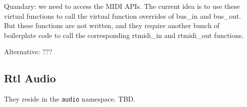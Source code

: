    Quandary: we need to access the MIDI APIs. The current idea is to use
   these virtual functions to call the virtual function overrides of bus\_in
   and bus\_out. But these functions are not written, and they require
   another bunch of boilerplate code to call the corresponding rtmidi\_in
   and rtmidi\_out functions.

   Alternative: ???



\subsection{Rtl Audio}
\label{subsec:rtl_audio}

   They reside in the \texttt{audio} namespace.
   TBD.

